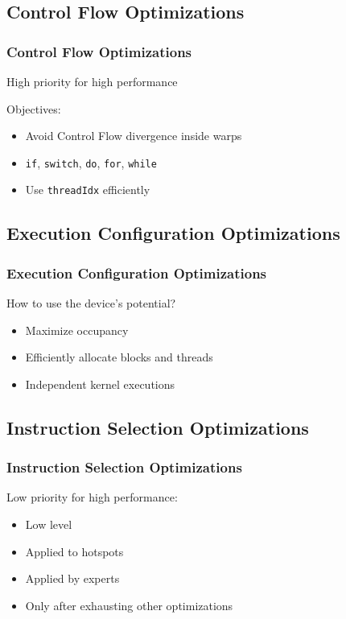 \documentclass[10pt, compress]{beamer}
\begin{document}
\subsection{Control Flow Optimizations}

\begin{frame}
    \frametitle{Control Flow Optimizations}
    \alert{High priority} for \alert{high performance}
    \pause

    Objectives:
    \begin{itemize}
        \item Avoid \alert{Control Flow divergence} inside warps
            \pause
        \item \texttt{\alert{if}}, \texttt{\alert{switch}},
            \texttt{\alert{do}}, \texttt{\alert{for}}, \texttt{\alert{while}}
            \pause
        \item Use \texttt{\alert{threadIdx}} efficiently
    \end{itemize}
\end{frame}

\subsection{Execution Configuration Optimizations}

\begin{frame}
    \frametitle{Execution Configuration Optimizations}
    How to use the \alert{device}'s potential?
    \pause
    \begin{itemize}
        \item Maximize \alert{occupancy}
            \pause
        \item Efficiently allocate \alert{blocks} and \alert{threads}
            \pause
        \item Independent \alert{kernel} executions
    \end{itemize}
\end{frame}

\subsection{Instruction Selection Optimizations}

\begin{frame}
    \frametitle{Instruction Selection Optimizations}
    \alert{Low priority} for \alert{high performance}:
    \pause
    \begin{itemize}
        \item \alert{Low level}
            \pause
        \item Applied to \alert{hotspots}
            \pause
        \item Applied by \alert{experts}
        \item Only after \alert{exhausting} other optimizations
    \end{itemize}
\end{frame}
\end{document}
